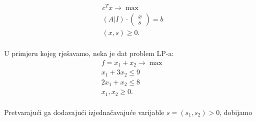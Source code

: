 \documentclass[a4paper, utf8, 11pt, colorlinks]{book}
\begin{document}
\begin{align}
    & c^T x \rightarrow \max \\
    & (A | I) \cdot \left (\begin{array}{c}
         x  \\
         s 
    \end{array} \right ) =  b \\
    & (x, s) \geq 0. \\
\end{align} 

U primjeru kojeg rješavamo, neka je dat problem LP-a:
\begin{align*}
    &f= x_1 + x_2 \rightarrow \max \nonumber \\
    & x_1 + 3 x_2 \leq 9 \nonumber \\
    & 2x_1 + x_2 \leq 8  \nonumber \\
    & x_1, x_2 \geq 0. \nonumber \\
\end{align*}
 
 Pretvarajući ga dodavajući izjednačavajuće varijable $s = (s_1, s_2)>0$, dobijamo 
\end{document}
